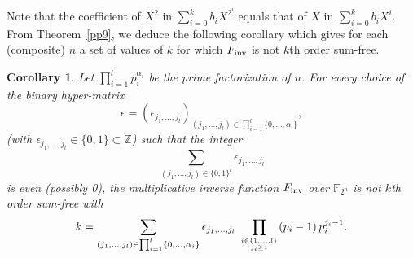 \documentclass{amsart}
\newtheorem{cor}[thm]{Corollary}
\numberwithin{equation}{section}
\theoremstyle{definition}
\newcommand{\fin}{F_{\text{\rm inv}}}
\begin{document}

Note that the coefficient of $X^2$ in $\sum_{i=0}^k b_iX^{2^{i}}$  equals that of $X$ in $\sum_{i=0}^k b_{i}X^i$. From Theorem~\ref{pp9}, we deduce the following corollary which gives for each (composite) $n$ a set of values of $k$ for which $\fin$ is not $k$th order sum-free.

\begin{cor}\label{c2}
Let $\prod_{i=1}^l p_i^{\alpha_i}$ be the prime factorization of $n$. For every choice of the binary hyper-matrix 
\[
\epsilon=(\epsilon_{j_1,\dots ,j_l})_{ (j_1,\dots ,j_l)\in \prod_{i=1}^l\{0,\dots ,\alpha_i\}},
\]
(with $\epsilon_{j_1,\dots ,j_l}\in \{0,1\}\subset \mathbb Z$) such that the integer \begin{equation}\label{sumepsilon}
\sum_{(j_1,\dots ,j_l)\in \{0,1\}^l}\epsilon_{j_1,\dots ,j_l}
\end{equation} 
is even (possibly 0), the multiplicative inverse function $\fin$ over $\mathbb F_{2^n}$ is not $k$th order sum-free with 
\[
k=\sum_{(j_1,\dots ,j_l)\in \prod_{i=1}^l\{0,\dots ,\alpha_i\}}\epsilon_{j_1,\dots ,j_l}\, \prod_{i\in \{1,\dots ,l\}\atop j_i\geq1}(p_i-1)\, p_i^{j_i-1}.
\]
\end{cor}
\end{document}
